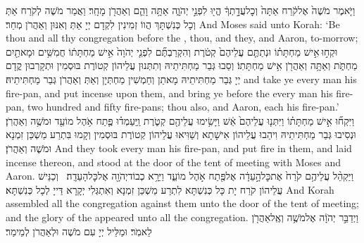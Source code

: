 {וַיֹּ֤אמֶר מֹשֶׁה֙ אֶל\maqqaf קֹ֔רַח אַתָּה֙ וְכׇל\maqqaf עֲדָ֣תְךָ֔ הֱי֖וּ לִפְנֵ֣י יְהֹוָ֑ה אַתָּ֥ה וָהֵ֛ם וְאַהֲרֹ֖ן מָחָֽר׃}
{וַאֲמַר מֹשֶׁה לְקֹרַח אַתְּ וְכָל כְּנִשְׁתָּךְ הֲווֹ זְמִינִין לִקְדָם יְיָ אַתְּ וְאִנּוּן וְאַהֲרֹן מְחַר׃}
{And Moses said unto Korah: ‘Be thou and all thy congregation before the \lord, thou, and they, and Aaron, to-morrow;}{}
{וּקְח֣וּ \legarmeh  אִ֣ישׁ מַחְתָּת֗וֹ וּנְתַתֶּ֤ם עֲלֵיהֶם֙ קְטֹ֔רֶת וְהִקְרַבְתֶּ֞ם לִפְנֵ֤י יְהֹוָה֙ אִ֣ישׁ מַחְתָּת֔וֹ חֲמִשִּׁ֥ים וּמָאתַ֖יִם מַחְתֹּ֑ת וְאַתָּ֥ה וְאַהֲרֹ֖ן אִ֥ישׁ מַחְתָּתֽוֹ׃}
{וְסַבוּ גְּבַר מַחְתִּיתֵיהּ וְתִתְּנוּן עֲלֵיהוֹן קְטוֹרֶת בּוּסְמִין וּתְקָרְבוּן קֳדָם יְיָ גְּבַר מַחְתִּיתֵיהּ מָאתַן וְחַמְשִׁין מַחְתְּיָן וְאַתְּ וְאַהֲרֹן גְּבַר מַחְתִּיתֵיהּ׃}
{and take ye every man his fire-pan, and put incense upon them, and bring ye before the \lord\space every man his fire-pan, two hundred and fifty fire-pans; thou also, and Aaron, each his fire-pan.’}{}
{וַיִּקְח֞וּ אִ֣ישׁ מַחְתָּת֗וֹ וַיִּתְּנ֤וּ עֲלֵיהֶם֙ אֵ֔שׁ וַיָּשִׂ֥ימוּ עֲלֵיהֶ֖ם קְטֹ֑רֶת וַֽיַּעַמְד֗וּ פֶּ֛תַח אֹ֥הֶל מוֹעֵ֖ד וּמֹשֶׁ֥ה וְאַהֲרֹֽן׃}
{וּנְסִיבוּ גְּבַר מַחְתִּיתֵיהּ וִיהַבוּ עֲלֵיהוֹן אִישָׁתָא וְשַׁוִּיאוּ עֲלֵיהוֹן קְטוֹרֶת בּוּסְמִין וְקָמוּ בִּתְרַע מַשְׁכַּן זִמְנָא וּמֹשֶׁה וְאַהֲרֹן׃}
{And they took every man his fire-pan, and put fire in them, and laid incense thereon, and stood at the door of the tent of meeting with Moses and Aaron.}{}
{וַיַּקְהֵ֨ל עֲלֵיהֶ֥ם קֹ֙רַח֙ אֶת\maqqaf כׇּל\maqqaf הָ֣עֵדָ֔ה אֶל\maqqaf פֶּ֖תַח אֹ֣הֶל מוֹעֵ֑ד וַיֵּרָ֥א כְבוֹד\maqqaf יְהֹוָ֖ה אֶל\maqqaf כׇּל\maqqaf הָעֵדָֽה׃ \setuma }
{וְכַנֵּישׁ עֲלֵיהוֹן קֹרַח יָת כָּל כְּנִשְׁתָּא לִתְרַע מַשְׁכַּן זִמְנָא וְאִתְגְּלִי יְקָרָא דַּייָ לְכָל כְּנִשְׁתָּא׃}
{And Korah assembled all the congregation against them unto the door of the tent of meeting; and the glory of the \lord\space appeared unto all the congregation.}{}
{וַיְדַבֵּ֣ר יְהֹוָ֔ה אֶל\maqqaf מֹשֶׁ֥ה וְאֶֽל\maqqaf אַהֲרֹ֖ן לֵאמֹֽר׃}
{וּמַלֵּיל יְיָ עִם מֹשֶׁה וּלְאַהֲרֹן לְמֵימַר׃}
